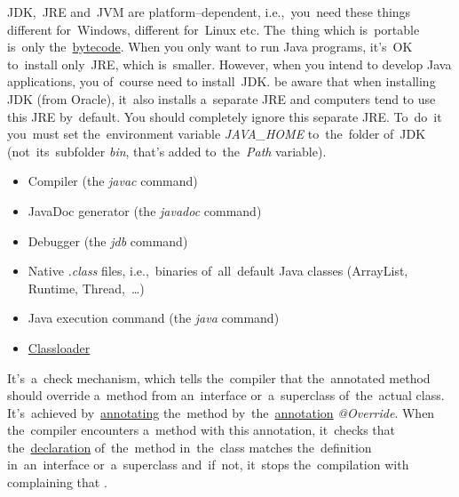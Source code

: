 \noindent JDK,~JRE and~JVM are platform--dependent, i.e.,~you~need these things different for~Windows, different for~Linux etc.
The~thing which is~portable is~only the~\hyperref[bytecode]{bytecode}.
When you only want to run Java programs, it's~OK to~install only~JRE, which is~smaller.
However, when you intend to develop Java applications, you of~course need to install~JDK.
be aware that when installing JDK (from Oracle), it~also installs a~separate JRE and computers tend to use this JRE by~default.
You should completely ignore this separate JRE.
To~do~it you~must set the~environment variable \textit{JAVA\_HOME} to~the~folder of~JDK (not~its~subfolder \textit{bin}, that's added to~the~\textit{Path} variable).

\begin{itemize}
    \item Compiler (the \textit{javac} command)
    \item JavaDoc generator (the \textit{javadoc} command)
    \item Debugger (the \textit{jdb} command)
\end{itemize}

\begin{itemize}
    \item Native \textit{.class} files, i.e.,~binaries of~all~default Java classes (ArrayList, Runtime, Thread,~\dots)
    \item Java execution command (the \textit{java} command)
    \item \hyperref[classloaders]{Classloader}
\end{itemize}

\label{javadatatypes}

\label{javaaccessmodifiers}

\label{javaoverride}
It's~a~check mechanism, which tells the~compiler that the~annotated method should override a~method from an~interface or~a~superclass of~the~actual class.
It's~achieved by~\hyperref[javaannotation]{annotating} the~method by~the~\hyperref[javaannotation]{annotation} \textit{@Override}.
When the~compiler encounters a~method with this annotation, it~checks that the~\hyperref[declarationdefinition]{declaration} of~the~method in~the~class matches the~definition in~an~interface or~a~superclass and~if~not, it~stops the~compilation with complaining that .

